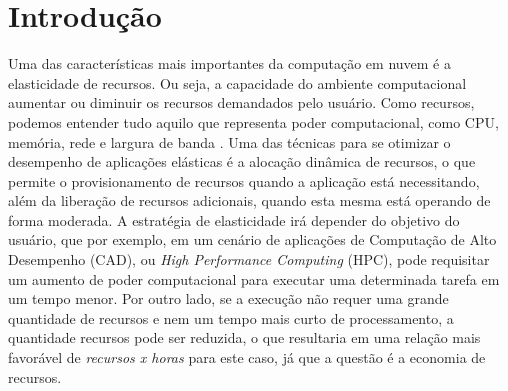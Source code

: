 \documentclass[twoside,english,brazilian]{UNISINOSartigo}
\begin{document}
%


\section{Introdução}

Uma das características mais importantes da computação em nuvem é a elasticidade de recursos. Ou seja, a capacidade do ambiente computacional aumentar ou diminuir os recursos demandados pelo usuário. Como recursos, podemos entender tudo aquilo que representa poder computacional, como CPU, memória, rede e largura de banda \cite{Bender2014}. Uma das técnicas para se otimizar o desempenho de aplicações elásticas é a alocação dinâmica de recursos, o que permite o provisionamento de recursos quando a aplicação está necessitando, além da liberação de recursos adicionais, quando esta mesma está operando de forma moderada. A estratégia de elasticidade irá depender do objetivo do usuário, que por exemplo, em um cenário de aplicações de Computação de Alto Desempenho (CAD), ou \textit{High Performance Computing} (HPC), pode requisitar um aumento de poder computacional para executar uma determinada tarefa em um tempo menor. Por outro lado, se a execução não requer uma grande quantidade de recursos e nem um tempo mais curto de processamento, a quantidade recursos pode ser reduzida, o que resultaria em uma relação mais favorável de \textit{recursos x horas} para este caso, já que a questão é a economia de recursos.
\end{document}
